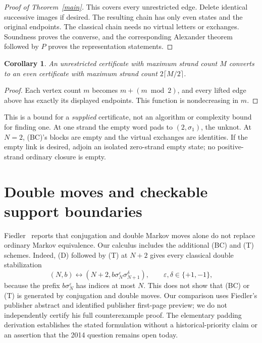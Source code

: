 \documentclass[11pt]{article}
\newtheorem{corollary}[theorem]{Corollary}
\newcommand{\sig}{\sigma}
\newcommand{\arr}{\longleftrightarrow}
\begin{document}
\begin{proof}[Proof of Theorem~\ref{main}]
This covers every unrestricted edge. Delete identical successive images if
desired. The resulting chain has only even states and the original endpoints.
The classical chain needs no virtual letters or exchanges. Soundness proves the
converse, and the corresponding Alexander theorem followed by $P$ proves the
representation statements.
\end{proof}

\begin{corollary}
An unrestricted certificate with maximum strand count $M$ converts to an even
certificate with maximum strand count $2\lceil M/2\rceil$.
\end{corollary}
\begin{proof}
Each vertex count $m$ becomes $m+(m\bmod2)$, and every lifted edge above has
exactly its displayed endpoints. This function is nondecreasing in $m$.
\end{proof}
This is a bound for a \emph{supplied} certificate, not an algorithm or complexity
bound for finding one. At one strand the empty word pads to $(2,\sig_1)$,
the unknot. At $N=2$, (BC)'s blocks are empty and the virtual exchanges are
identities. If the empty link is desired, adjoin an isolated zero-strand empty
state; no positive-strand ordinary closure is empty.

\section{Double moves and checkable support boundaries}
Fiedler~\cite{Fiedler} reports that conjugation and double Markov moves alone
do not replace ordinary Markov equivalence. Our calculus includes the additional
(BC) and (T) schemes. Indeed, (D) followed by (T) at $N+2$ gives every classical
double stabilization
\[
 (N,b)\arr (N+2,b\sig_N^\varepsilon\sig_{N+1}^\delta),
 \qquad \varepsilon,\delta\in\{+1,-1\},
\]
because the prefix $b\sig_N^\varepsilon$ has indices at most $N$.
This does not show that (BC) or (T) is generated by conjugation and double moves.
Our comparison uses Fiedler's publisher abstract and identified publisher
first-page preview; we do not independently certify his full counterexample
proof. The elementary padding derivation establishes the stated formulation
without a historical-priority claim or an assertion that the 2014 question
remains open today.
\end{document}
